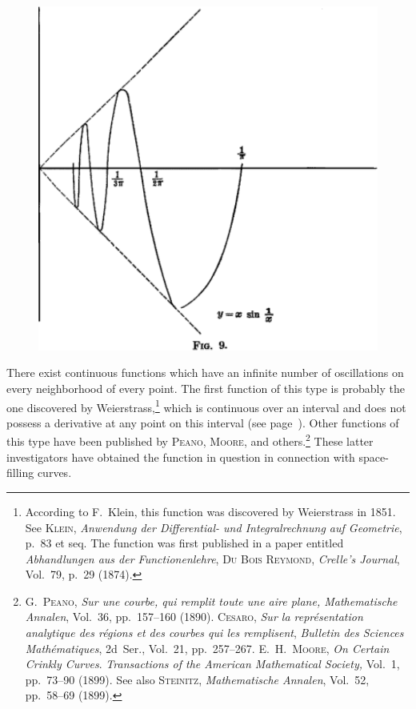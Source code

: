 \documentclass[a4paper,12pt]{book}[2004/02/16]
\providecommand{\hypertarget}[2]{#2}
\theoremstyle{ilemma}
\theoremstyle{itheorem}
\theoremstyle{iother}
\theoremstyle{icorollary}
\theoremstyle{numcorollary}
\theoremstyle{idefinition}
\begin{document}
\begin{figure}[!hbtp]\label{fig09}\hypertarget{fig09}{}
\centering
\includegraphics{images/fig09}
\end{figure}

\label{oscillp51}There exist continuous functions which have an infinite
number of oscillations on every neighborhood of every point.  The
first function of this type is probably the one discovered by
Weierstrass,\footnote{%
    According to F.~Klein, this function was discovered by Weierstrass
    in 1851. See \textsc{Klein}, \textit{Anwendung der Differential-
    und Integralrechnung auf Geometrie}, p.~83 et seq. The function
    was first published in a paper entitled \textit{Abhandlungen aus
    der Functionenlehre}, \textsc{Du Bois Reymond}, \textit{Crelle's
    Journal}, Vol.~79, p.~29 (1874).}
which is continuous over an interval and does not possess a derivative
at any point on this interval (see page~\pageref{nowherediffp150}).
Other functions of this type have been published by \textsc{Peano},
\textsc{Moore}, and others.\footnote{%
    \textsc{G.~Peano}, \textit{Sur une courbe, qui remplit toute une
    aire plane, Mathematische Annalen}, Vol.~36, pp.~157--160
    (1890). \textsc{Cesaro}, \textit{Sur la repr\'esentation
    analytique des r\'egions et des courbes qui les remplisent},
    \textit{Bulletin des Sciences Math\'ematiques}, 2d~Ser., Vol.~21,
    pp.~257--267. \textsc{E.~H.~Moore}, \textit{On Certain Crinkly
    Curves}. \textit{Transactions of the American Mathematical
    Society,} Vol.~1, pp.~73--90 (1899). See also \textsc{Steinitz},
    \textit{Mathematische Annalen}, Vol.~52, pp.~58--69 (1899).}
These latter investigators have obtained the function in question in
connection with space-filling curves.
\end{document}
